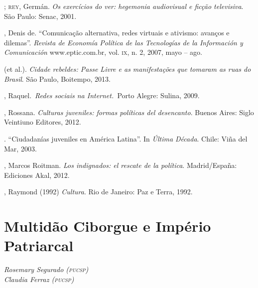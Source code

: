 \begin{bibliohedra}
\titidem; \textsc{rey}, Germán. \emph{Os exercícios do ver:
hegemonia audiovisual e ficção televisiva}. São Paulo: Senac, 2001.

, Denis de. ``Comunicação alternativa, redes virtuais e ativismo:
avanços e dilemas''. \emph{Revista de Economía Política de las
Tecnologías de la Información y Comunicación} www.eptic.com.br, vol. \textsc{ix},
n. 2, 2007, mayo -- ago.

 (et al.). \emph{Cidade rebeldes: Passe Livre e as
manifestações que tomaram as ruas do Brasil}. São Paulo, Boitempo, 2013.

, Raquel.~\emph{Redes sociais na Internet.~}Porto Alegre: Sulina,
2009.

, Rossana. \emph{Culturas juveniles: formas políticas del
desencanto}. Buenos Aires: Siglo Veintiuno Editores, 2012.

\titidem. ``Ciudadanías juveniles en América
Latina''. In \emph{Última Década}. Chile: Viña del Mar, 2003.

, Marcos Roitman. \emph{Los indignados: el rescate de la
política}. Madrid/España: Ediciones Akal, 2012.

, Raymond (1992) \emph{Cultura}. Rio de Janeiro: Paz e Terra,
1992.
\end{bibliohedra}


\chapter*{Multidão Ciborgue e Império Patriarcal}

\begin{flushright}
\emph{Rosemary Segurado (\textsc{pucsp})\\Claudia Ferraz (\textsc{pucsp})}
\end{flushright}

